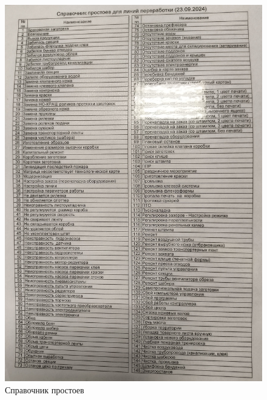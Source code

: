 \begin{figure}
\begin{center}
 \includegraphics[height=0.9\textheight, keepaspectratio]{Pics/IIIсправочникпростоев.jpg}
\end{center}
 \caption{Справочник простоев}
 \label{pic:IIIсправочникпростоев}
\end{figure}
\clearpage
